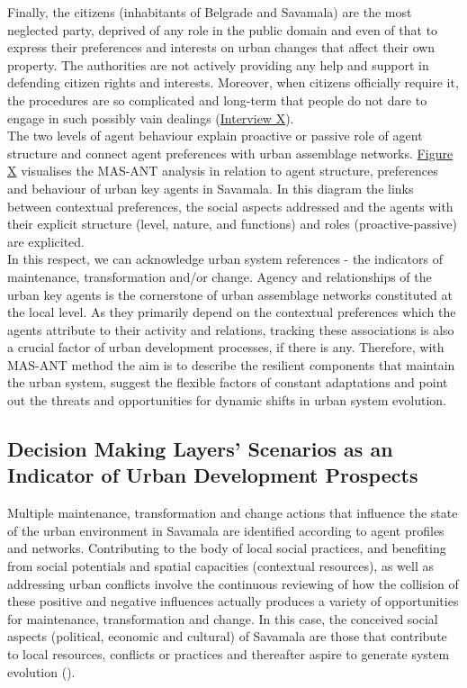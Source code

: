 \documentclass[11pt]{report}
\begin{document}
Finally, the citizens (inhabitants of Belgrade and Savamala) are the most neglected party, deprived of any role in the public domain and even of that to express their preferences and interests on urban changes that affect their own property. 
The authorities are not actively providing any help and support in defending citizen rights and interests.
Moreover, when citizens officially require it, the procedures are so complicated and long-term that people do not dare to engage in such possibly vain dealings
(\href{InterviewX}{Interview X}).
\\

The two levels of agent behaviour explain proactive or passive role of agent structure and connect agent preferences with urban assemblage networks.
\href{FigureX}{Figure X} visualises the MAS-ANT analysis in relation to agent structure, preferences and behaviour of urban key agents in Savamala.
In this diagram the links between contextual preferences, the social aspects addressed and the agents with their explicit structure (level, nature, and functions) and roles (proactive-passive) are explicited.
\\

In this respect, we can acknowledge urban system references - the indicators of maintenance, transformation and/or change.
Agency and relationships of the urban key agents is the cornerstone of urban assemblage networks constituted at the local level.
As they primarily depend on the contextual preferences which the agents attribute to their activity and relations, tracking these associations is also a crucial factor of urban development processes, if there is any.
Therefore, with MAS-ANT method the aim is to describe the resilient components that maintain the urban system, suggest the flexible factors of constant adaptations and point out the threats and opportunities for dynamic shifts in urban system evolution.



\subsection{Decision Making Layers' Scenarios as an Indicator of Urban Development Prospects}

Multiple maintenance, transformation and change actions that influence the state of the urban environment in Savamala are identified according to agent profiles and networks.
Contributing to the body of local social practices, and benefiting from social potentials and spatial capacities (contextual resources), as well as addressing urban conflicts involve the continuous reviewing of how the collision of these positive and negative influences actually produces a variety of opportunities for maintenance, transformation and change.
In this case, the conceived social aspects (political, economic and cultural) of Savamala are those that contribute to local resources, conflicts or practices and thereafter aspire to generate system evolution (\href{Cvetinovic}{\cite{CvetinovicEtAl.2013}}). 
\\
\end{document}
